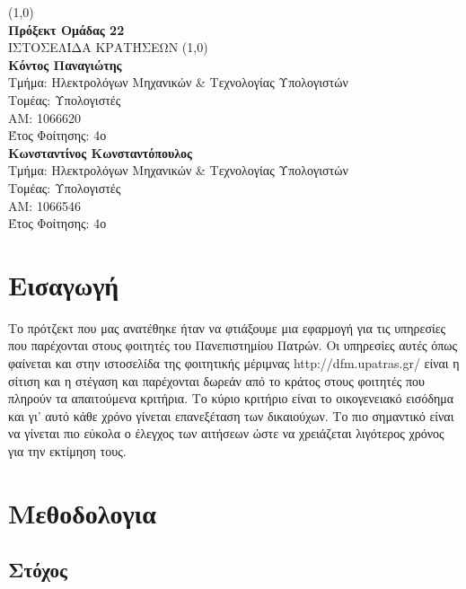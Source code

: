 \documentclass{acmart}
\begin{document}
       \begin{titlepage}
              \begin{center}
              \vspace*{1cm}

              \line(1,0){\textwidth}\\
              \textbf{Πρόξεκτ Ομάδας 22}\\
              \vspace{0.5cm}
              ΙΣΤΟΣΕΛΊΔΑ ΚΡΑΤΉΣΕΩΝ
              \vspace{1.5cm}
              \line(1,0){\textwidth}\\
              \textbf{Κόντος Παναγιώτης}\\
              Τμήμα: Ηλεκτρολόγων Μηχανικών \& Τεχνολογίας Υπολογιστών\\
              Τομέας: Υπολογιστές\\
              ΑΜ: 1066620\\
              Έτος Φοίτησης: 4ο\\
              \vspace{0.8cm}
              \textbf{Κωνσταντίνος Κωνσταντόπουλος}\\
                     Τμήμα: Ηλεκτρολόγων Μηχανικών \& Τεχνολογίας Υπολογιστών\\
              Τομέας: Υπολογιστές\\
              ΑΜ: 1066546\\
              Έτος Φοίτησης: 4ο\\

              \vspace{0.8cm}


              
              \end{center}
       \end{titlepage}
\tableofcontents

\section{Εισαγωγή}
Το πρότζεκτ που μας ανατέθηκε ήταν να φτιάξουμε μια εφαρμογή για τις υπηρεσίες που παρέχονται στους φοιτητές του Πανεπιστημίου Πατρών. Οι υπηρεσίες αυτές όπως φαίνεται και στην ιστοσελίδα της φοιτητικής μέριμνας http://dfm.upatras.gr/  είναι η σίτιση και η στέγαση και παρέχονται δωρεάν από το κράτος στους φοιτητές που πληρούν τα απαιτούμενα κριτήρια.  Το κύριο κριτήριο είναι το οικογενειακό εισόδημα και γι’ αυτό κάθε χρόνο γίνεται επανεξέταση των δικαιούχων. Το πιο σημαντικό είναι να γίνεται πιο εύκολα ο έλεγχος των αιτήσεων ώστε να χρειάζεται λιγότερος χρόνος για την εκτίμηση τους.
\section{Μεθοδολογια}
\subsection{Στόχος}
\end{document}
